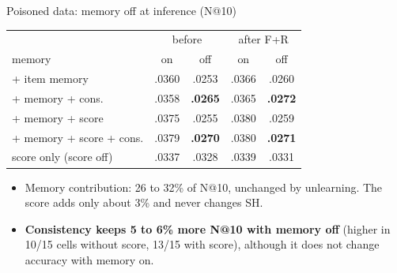 \documentclass{beamer}
\begin{document}
\begin{frame}{Poisoned data: memory off at inference (N@10)}
\centering
\small
\begin{tabular}{lcccc}
\toprule
                         & \multicolumn{2}{c}{before} & \multicolumn{2}{c}{after F+R} \\
memory                   & on & off & on & off \\
\midrule
+ item memory            & .0360 & .0253 & .0366 & .0260 \\
+ memory + cons.         & .0358 & \textbf{.0265} & .0365 & \textbf{.0272} \\
\midrule
+ memory + score         & .0375 & .0255 & .0380 & .0259 \\
+ memory + score + cons. & .0379 & \textbf{.0270} & .0380 & \textbf{.0271} \\
\midrule
score only (score off)   & .0337 & .0328 & .0339 & .0331 \\
\bottomrule
\end{tabular}

\medskip
\begin{itemize}\footnotesize
  \item Memory contribution: 26 to 32\% of N@10, unchanged by unlearning.
        The score adds only about 3\% and never changes SH.
  \item \textbf{Consistency keeps 5 to 6\% more N@10 with memory off}
        (higher in 10/15 cells without score, 13/15 with score), although
        it does not change accuracy with memory on.
\end{itemize}
\end{frame}
\end{document}
